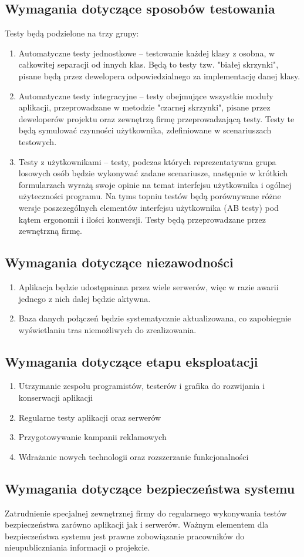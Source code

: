 \documentclass[12pt,a4paper]{report}
\begin{document}
\subsection{Wymagania dotyczące sposobów testowania}
Testy będą podzielone na trzy grupy:
\begin{enumerate}
	\item Automatyczne testy jednostkowe -- testowanie każdej klasy z osobna, w całkowitej separacji od innych klas. Będą to testy tzw. "białej skrzynki", pisane będą przez dewelopera odpowiedzialnego za implementację danej klasy.
	\item Automatyczne testy integracyjne -- testy obejmujące wszystkie moduły aplikacji, przeprowadzane w metodzie "czarnej skrzynki", pisane przez deweloperów projektu oraz zewnętrzą firmę przeprowadzającą testy. Testy te będą symulować czynności użytkownika, zdefiniowane w scenariuszach testowych.
	\item Testy z użytkownikami -- testy, podczas których reprezentatywna grupa losowych osób będzie wykonywać zadane scenariusze, następnie w krótkich formularzach wyrażą swoje opinie na temat interfejsu użytkownika i ogólnej użyteczności programu. Na tyms topniu testów będą porównywane różne wersje poszczególnych elementów interfejsu użytkownika (AB testy) pod kątem ergonomii i ilości konwersji. Testy będą przeprowadzane przez zewnętrzną firmę.
\end{enumerate}
\subsection{Wymagania dotyczące niezawodności}
\begin{enumerate}
	\item Aplikacja będzie udostępniana przez wiele serwerów, więc w razie awarii jednego z nich dalej będzie aktywna.
	\item Baza danych połączeń będzie systematycznie aktualizowana, co zapobiegnie wyświetlaniu tras niemożliwych do zrealizowania.
\end{enumerate}
\subsection{Wymagania dotyczące etapu eksploatacji}
\begin{enumerate}
	\item Utrzymanie zespołu programistów, testerów i grafika do rozwijania i konserwacji aplikacji
	\item Regularne testy aplikacji oraz serwerów
	\item Przygotowywanie kampanii reklamowych
	\item Wdrażanie nowych technologii oraz rozszerzanie funkcjonalności
\end{enumerate}	
\subsection{Wymagania dotyczące bezpieczeństwa systemu}
	Zatrudnienie specjalnej zewnętrznej firmy do regularnego wykonywania testów bezpieczeństwa zarówno aplikacji jak i serwerów. Ważnym elementem dla bezpieczeństwa systemu jest prawne zobowiązanie pracowników do nieupubliczniania informacji o projekcie.
\end{document}
